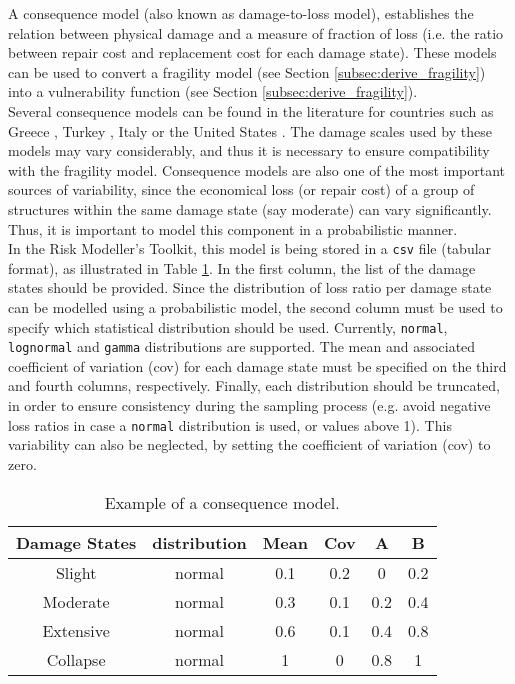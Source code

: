 A consequence model (also known as damage-to-loss model), establishes the relation between physical damage and a measure of fraction of loss (i.e. the ratio between repair cost and replacement cost for each damage state). These models can be used to convert a fragility model (see Section \ref{subsec:derive_fragility}) into a vulnerability function (see Section \ref{subsec:derive_fragility}). \\

Several consequence models can be found in the literature for countries such as Greece \citep{KapposEtAl2006}, Turkey \citep{BalEtAl2010}, Italy \citep{DiPasqualeandGoretti2001} or the United States \citep{FEMA2003}. The damage scales used by these models may vary considerably, and thus it is necessary to ensure compatibility with the fragility model. Consequence models are also one of the most important sources of variability, since the economical loss (or repair cost) of a group of structures within the same damage state (say moderate) can vary significantly. Thus, it is important to model this component in a probabilistic manner.\\

In the Risk Modeller's Toolkit, this model is being stored in a \verb=csv= file (tabular format), as illustrated in Table \ref{table:cons_model}. In the first column, the list of the damage states should be provided. Since the distribution of loss ratio per damage state can be modelled using a probabilistic model, the second column must be used to specify which statistical distribution should be used. Currently, \verb=normal=, \verb=lognormal= and \verb=gamma= distributions are supported. The mean and associated coefficient of variation (cov) for each damage state must be specified on the third and fourth columns, respectively. Finally, each distribution should be truncated, in order to ensure consistency during the sampling process (e.g. avoid negative loss ratios in case a \verb=normal= distribution is used, or values above 1). This variability can also be neglected, by setting the coefficient of variation (cov) to zero.

\begin {table}[htb]
\caption{Example of a consequence model.}
\label{table:cons_model}
\begin{center}
  \begin{tabular}{ | c | c | c | c | c | c |}
  \hline
Damage States & distribution & Mean & Cov & A & B\\ \hline
Slight & normal & 0.1 & 0.2 & 0 & 0.2\\ \hline
Moderate & normal & 0.3 & 0.1 & 0.2 & 0.4\\ \hline
Extensive & normal & 0.6 & 0.1 & 0.4 & 0.8\\ \hline
Collapse & normal & 1 & 0 & 0.8 & 1\\ \hline
  \end{tabular}
\end{center}
\end{table}

